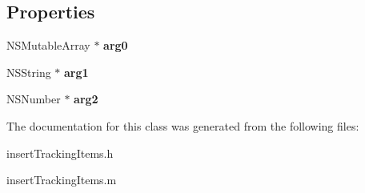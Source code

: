 \subsection*{Properties}
\begin{DoxyCompactItemize}
\item 
\hypertarget{interfaceinsert_tracking_items_a3efaac116eb2aecf5c815cc54ae7a80b}{}N\+S\+Mutable\+Array $\ast$ {\bfseries arg0}\label{interfaceinsert_tracking_items_a3efaac116eb2aecf5c815cc54ae7a80b}

\item 
\hypertarget{interfaceinsert_tracking_items_a060339ffb26e11cff7aeb7bb50643da1}{}N\+S\+String $\ast$ {\bfseries arg1}\label{interfaceinsert_tracking_items_a060339ffb26e11cff7aeb7bb50643da1}

\item 
\hypertarget{interfaceinsert_tracking_items_a06b62ef52ae9b68e16013ab1b37d9b58}{}N\+S\+Number $\ast$ {\bfseries arg2}\label{interfaceinsert_tracking_items_a06b62ef52ae9b68e16013ab1b37d9b58}

\end{DoxyCompactItemize}


The documentation for this class was generated from the following files\+:\begin{DoxyCompactItemize}
\item 
insert\+Tracking\+Items.\+h\item 
insert\+Tracking\+Items.\+m\end{DoxyCompactItemize}

